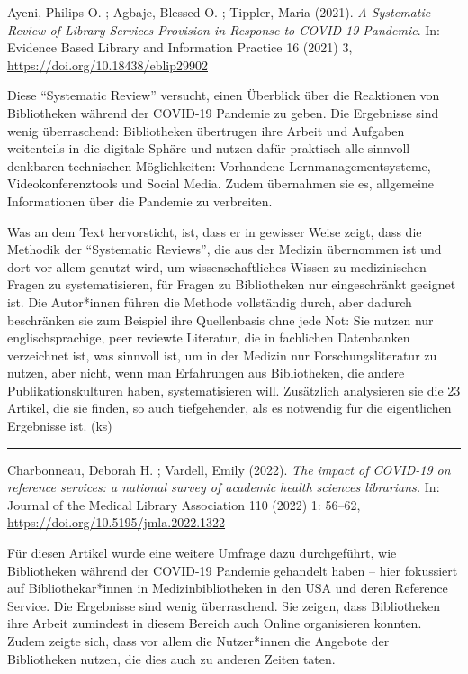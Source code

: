 \documentclass[a4paper,
fontsize=11pt,
oneside,
numbers=noperiodatend,
parskip=half-,
bibliography=totoc,
final
]{scrartcl}
\begin{document}
Ayeni, Philips O. ; Agbaje, Blessed O. ; Tippler, Maria (2021). \emph{A
Systematic Review of Library Services Provision in Response to COVID-19
Pandemic}. In: Evidence Based Library and Information Practice 16 (2021)
3, \url{https://doi.org/10.18438/eblip29902}

Diese \enquote{Systematic Review} versucht, einen Überblick über die
Reaktionen von Bibliotheken während der COVID-19 Pandemie zu geben. Die
Ergebnisse sind wenig überraschend: Bibliotheken übertrugen ihre Arbeit
und Aufgaben weitenteils in die digitale Sphäre und nutzen dafür
praktisch alle sinnvoll denkbaren technischen Möglichkeiten: Vorhandene
Lernmanagementsysteme, Videokonferenztools und Social Media. Zudem
übernahmen sie es, allgemeine Informationen über die Pandemie zu
verbreiten.

Was an dem Text hervorsticht, ist, dass er in gewisser Weise zeigt, dass
die Methodik der \enquote{Systematic Reviews}, die aus der Medizin
übernommen ist und dort vor allem genutzt wird, um wissenschaftliches
Wissen zu medizinischen Fragen zu systematisieren, für Fragen zu
Bibliotheken nur eingeschränkt geeignet ist. Die Autor*innen führen die
Methode vollständig durch, aber dadurch beschränken sie zum Beispiel
ihre Quellenbasis ohne jede Not: Sie nutzen nur englischsprachige, peer
reviewte Literatur, die in fachlichen Datenbanken verzeichnet ist, was
sinnvoll ist, um in der Medizin nur Forschungsliteratur zu nutzen, aber
nicht, wenn man Erfahrungen aus Bibliotheken, die andere
Publikationskulturen haben, systematisieren will. Zusätzlich analysieren
sie die 23 Artikel, die sie finden, so auch tiefgehender, als es
notwendig für die eigentlichen Ergebnisse ist. (ks)

\begin{center}\rule{0.5\linewidth}{0.5pt}\end{center}

Charbonneau, Deborah H. ; Vardell, Emily (2022). \emph{The impact of
COVID-19 on reference services: a national survey of academic health
sciences librarians.} In: Journal of the Medical Library Association 110
(2022) 1: 56--62, \url{https://doi.org/10.5195/jmla.2022.1322}

Für diesen Artikel wurde eine weitere Umfrage dazu durchgeführt, wie
Bibliotheken während der COVID-19 Pandemie gehandelt haben -- hier
fokussiert auf Bibliothekar*innen in Medizinbibliotheken in den USA und
deren Reference Service. Die Ergebnisse sind wenig überraschend. Sie
zeigen, dass Bibliotheken ihre Arbeit zumindest in diesem Bereich auch
Online organisieren konnten. Zudem zeigte sich, dass vor allem die
Nutzer*innen die Angebote der Bibliotheken nutzen, die dies auch zu
anderen Zeiten taten.
\end{document}
